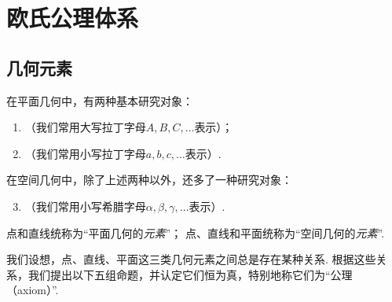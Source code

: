 \section{欧氏公理体系}
\subsection{几何元素}
\begin{definition}\label{definition:欧氏几何.几何元素.基本几何元素}
在平面几何中，有两种基本研究对象：
\begin{enumerate}
	\item {}（我们常用大写拉丁字母\(A,B,C,\dotsc\)表示）；
	\item {}（我们常用小写拉丁字母\(a,b,c,\dotsc\)表示）.
\end{enumerate}
在空间几何中，除了上述两种以外，还多了一种研究对象：
\begin{enumerate}
\setcounter{enumi}{2}
	\item {}（我们常用小写希腊字母\(\alpha,\beta,\gamma,\dotsc\)表示）.
\end{enumerate}
点和直线统称为“平面几何的\emph{元素}”；
点、直线和平面统称为“空间几何的\emph{元素}”.
\end{definition}

我们设想，点、直线、平面这三类几何元素之间总是存在某种关系.
根据这些关系，我们提出以下五组命题，并认定它们恒为真，特别地称它们为“公理（axiom）”.

